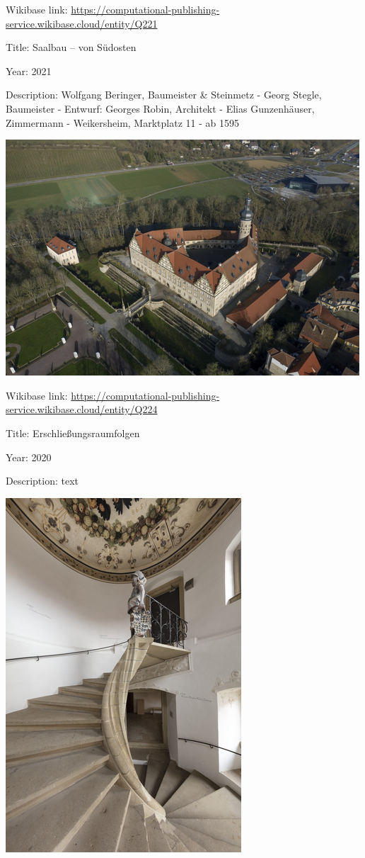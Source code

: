 \documentclass[
  letterpaper,
]{book}
\begin{document}
Wikibase link:
\url{https://computational-publishing-service.wikibase.cloud/entity/Q221}

Title: Saalbau -- von Südosten

Year: 2021

Description: Wolfgang Beringer, Baumeister \& Steinmetz - Georg Stegle,
Baumeister - Entwurf: Georges Robin, Architekt - Elias Gunzenhäuser,
Zimmermann - Weikersheim, Marktplatz 11 - ab 1595

\includegraphics{paintings_files/figure-pdf/cell-3-output-14.png}

Wikibase link:
\url{https://computational-publishing-service.wikibase.cloud/entity/Q224}

Title: Erschließungsraumfolgen

Year: 2020

Description: text

\includegraphics{paintings_files/figure-pdf/cell-3-output-16.png}
\end{document}

